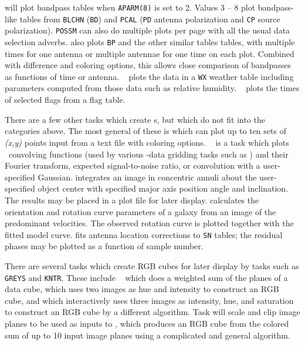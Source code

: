 {\tt {}} will plot bandpass tables when {\tt APARM(8)} is
set to 2.  Values 3 -- 8 plot bandpass-like tables from {\tt BLCHN}
({\tt BD}) and {\tt PCAL} ({\tt PD} antenna polarization and {\tt CP}
source polarization).  {\tt POSSM} can also do multiple plots per page
with all the usual data selection adverbs.  {\tt {}} also
plots {\tt BP} and the other similar tables tables, with multiple
times for one antenna or multiple antennae for one time on each plot.
Combined with difference and coloring options, this allows close
comparison of bandpasses as functions of time or antenna.  {\tt
{}} plots the data in a {\tt WX} weather table including
parameters computed from those data such as relative humidity.  {\tt
{}} plots the times of selected flags from a flag table.


     There are a few other tasks which create s, but
which do not fit into the categories above.  The most general of these
is {\tt {}} which can plot up to ten sets of {\it (x,y)\/}
points input from a text file with coloring options.  {\tt
{}} is a task which plots \AIPS\ convolving functions (used
by various \uv-data gridding tasks such as {\tt {}}) and
their Fourier transform, expected signal-to-noise ratio, or
convolution with a user-specified Gaussian.  {\tt {}}
integrates an image in concentric annuli about the user-specified
object center with specified major axis position angle and
inclination.  The results may be placed in a plot file for later
display.  {\tt {}} calculates the orientation and rotation
curve parameters of a galaxy from an image of the predominant
velocities.  The observed rotation curve is plotted together with the
fitted model curve.  {\tt {}} fits antenna location
corrections to {\tt SN} tables; the residual phases may be plotted as
a function of sample number.

There are several tasks which create RGB cubes for later display by
tasks such as {\tt GREYS} and {\tt KNTR}\@.  These include {\tt
{}} which does a weighted sum of the planes of a data cube,
{\tt {}} which uses two images as hue and intensity to
construct an RGB cube, and {\tt {}} which interactively uses
three images as intensity, hue, and saturation to construct an RGB
cube by a different algorithm.  Task {\tt {}} will scale and
clip image planes to be used as inputs to {\tt {}}, which
produces an RGB cube from the colored sum of up to 10 input image
planes using a complicated and general algorithm.

